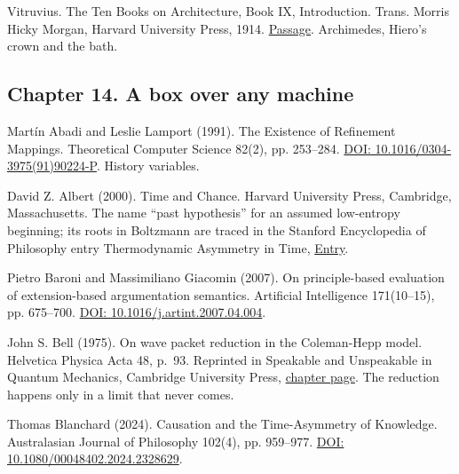 \noindent Vitruvius. The Ten Books on Architecture, Book IX, Introduction. Trans. Morris Hicky Morgan, Harvard University Press, 1914. \href{https://math.nyu.edu/Archimedes/Crown/Vitruvius.html}{Passage}. Archimedes, Hiero's crown and the bath.
\par\medskip

\subsection*{Chapter 14. A box over any machine}

\noindent Mart\'in Abadi and Leslie Lamport (1991). The Existence of Refinement Mappings. Theoretical Computer Science 82(2), pp. 253--284. \href{https://doi.org/10.1016/0304-3975(91)90224-P}{DOI: 10.1016/0304-3975(91)90224-P}. History variables.
\par\medskip

\noindent David Z. Albert (2000). Time and Chance. Harvard University Press, Cambridge, Massachusetts. The name ``past hypothesis'' for an assumed low-entropy beginning; its roots in Boltzmann are traced in the Stanford Encyclopedia of Philosophy entry Thermodynamic Asymmetry in Time, \href{https://plato.stanford.edu/entries/time-thermo/}{Entry}.
\par\medskip

\noindent Pietro Baroni and Massimiliano Giacomin (2007). On principle-based evaluation of extension-based argumentation semantics. Artificial Intelligence 171(10--15), pp. 675--700. \href{https://doi.org/10.1016/j.artint.2007.04.004}{DOI: 10.1016/j.artint.2007.04.004}.
\par\medskip

\noindent John S. Bell (1975). On wave packet reduction in the Coleman-Hepp model. Helvetica Physica Acta 48, p.~93. Reprinted in Speakable and Unspeakable in Quantum Mechanics, Cambridge University Press, \href{https://www.cambridge.org/core/books/speakable-and-unspeakable-in-quantum-mechanics/on-wave-packet-reduction-in-the-colemanhepp-model/95A04BE1845F5490A462D929930CA7E8}{chapter page}. The reduction happens only in a limit that never comes.
\par\medskip

\noindent Thomas Blanchard (2024). Causation and the Time-Asymmetry of Knowledge. Australasian Journal of Philosophy 102(4), pp. 959--977. \href{https://doi.org/10.1080/00048402.2024.2328629}{DOI: 10.1080/00048402.2024.2328629}.
\par\medskip

